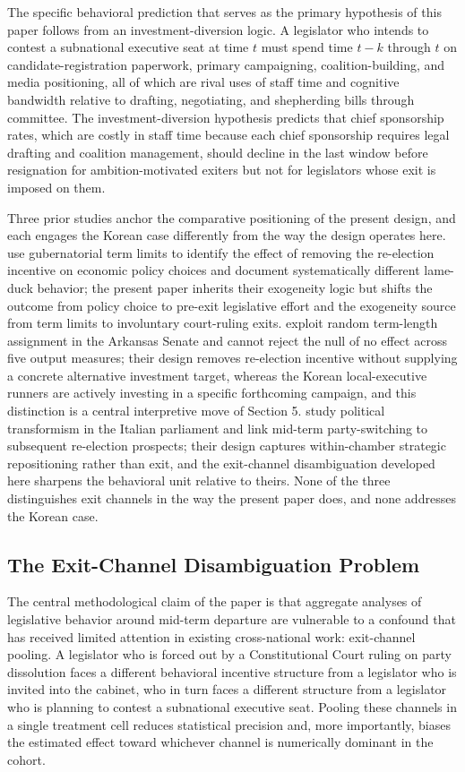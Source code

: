 \documentclass[11pt]{article}
\begin{document}
The specific behavioral prediction that serves as the primary hypothesis of this paper follows from an investment-diversion logic. A legislator who intends to contest a subnational executive seat at time $t$ must spend time $t - k$ through $t$ on candidate-registration paperwork, primary campaigning, coalition-building, and media positioning, all of which are rival uses of staff time and cognitive bandwidth relative to drafting, negotiating, and shepherding bills through committee. The investment-diversion hypothesis predicts that chief sponsorship rates, which are costly in staff time because each chief sponsorship requires legal drafting and coalition management, should decline in the last window before resignation for ambition-motivated exiters but not for legislators whose exit is imposed on them.

Three prior studies anchor the comparative positioning of the present design, and each engages the Korean case differently from the way the design operates here. \citet{besley1995} use gubernatorial term limits to identify the effect of removing the re-election incentive on economic policy choices and document systematically different lame-duck behavior; the present paper inherits their exogeneity logic but shifts the outcome from policy choice to pre-exit legislative effort and the exogeneity source from term limits to involuntary court-ruling exits. \citet{titiunik2017} exploit random term-length assignment in the Arkansas Senate and cannot reject the null of no effect across five output measures; their design removes re-election incentive without supplying a concrete alternative investment target, whereas the Korean local-executive runners are actively investing in a specific forthcoming campaign, and this distinction is a central interpretive move of Section 5. \citet{giommoni2022} study political transformism in the Italian parliament and link mid-term party-switching to subsequent re-election prospects; their design captures within-chamber strategic repositioning rather than exit, and the exit-channel disambiguation developed here sharpens the behavioral unit relative to theirs. None of the three distinguishes exit channels in the way the present paper does, and none addresses the Korean case.

\subsection{The Exit-Channel Disambiguation Problem}

The central methodological claim of the paper is that aggregate analyses of legislative behavior around mid-term departure are vulnerable to a confound that has received limited attention in existing cross-national work: exit-channel pooling. A legislator who is forced out by a Constitutional Court ruling on party dissolution \citep{leehs2014} faces a different behavioral incentive structure from a legislator who is invited into the cabinet, who in turn faces a different structure from a legislator who is planning to contest a subnational executive seat. Pooling these channels in a single treatment cell reduces statistical precision and, more importantly, biases the estimated effect toward whichever channel is numerically dominant in the cohort.
\end{document}
